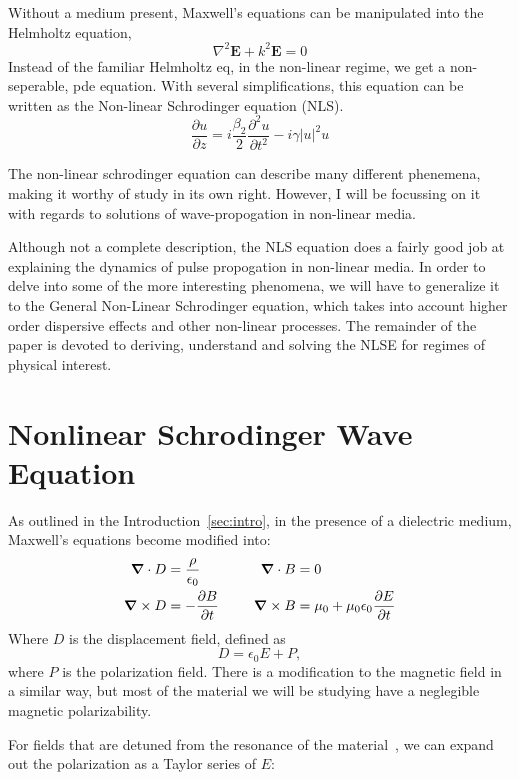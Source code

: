 \documentclass[12pt, titlepage]{article}
\renewcommand{\v}[1]{\ensuremath{\mathbf{#1}}} %
\renewcommand{\pd}[2]{\frac{\partial #1}{\partial #2}}
\newcommand{\pdd}[2]{\frac{\partial^2 #1}{\partial #2^2}}
\newcommand{\gv}[1]{\ensuremath{\mbox{\boldmath$ #1 $}}}
\renewcommand{\div}[1]{\gv{\nabla} \cdot #1} %
\newcommand{\curl}[1]{\gv{\nabla} \times #1} %
\begin{document}
\begin{spacing}{1.1}
Without a medium present, Maxwell's equations can be manipulated into the Helmholtz equation,
\begin{equation}
\nabla^2 \v{E} + k^2 \v{E} = 0
\end{equation}
Instead of the familiar Helmholtz eq, in the non-linear regime, we get a non-seperable, pde equation. With several simplifications, this equation can be written as the Non-linear Schrodinger equation (NLS).
\[
\label{eq:nls}
\pd{u}{z} =i \frac{\beta_2}{2}\pdd{u}{t}-i\gamma|u|^2u 
\]

The non-linear schrodinger equation can describe many different phenemena, making it worthy of study in its own right. However, I will be focussing on it with regards to solutions of wave-propogation in non-linear media.

Although not a complete description, the NLS equation does a fairly good job at explaining the dynamics of pulse propogation in non-linear media.
In order to delve into some of the more interesting phenomena, we will have to generalize it to the General Non-Linear Schrodinger equation, which takes into account higher order dispersive effects and other non-linear processes.
The remainder of the paper is devoted to deriving, understand and solving the NLSE for regimes of physical interest.

\section{Nonlinear Schrodinger Wave Equation}
As outlined in the Introduction~\ref{sec:intro}, in the presence of a dielectric medium, Maxwell's equations become modified into:\begin{alignat}{2}
       \div{D} &= \frac{\rho}{\epsilon_0} &\qquad \div{B} &=0\\
       \curl{D} &=- \pd{B}{t}  & \curl{B} &= \mu_0 + \mu_0 \epsilon_0 \pd{E}{t} 
       \end{alignat}
Where $D$ is the displacement field, defined as 
\begin{equation}
D = \epsilon_0 E + P,
\end{equation}
where $P$ is the polarization field. 
There is a modification to the magnetic field in a similar way, but most of the material we will be studying have a
neglegible magnetic polarizability.

For fields that are detuned from the resonance of the material~\cite{boyd}, we can expand out the polarization as a Taylor series of $E$:


\end{spacing}
\end{document}
